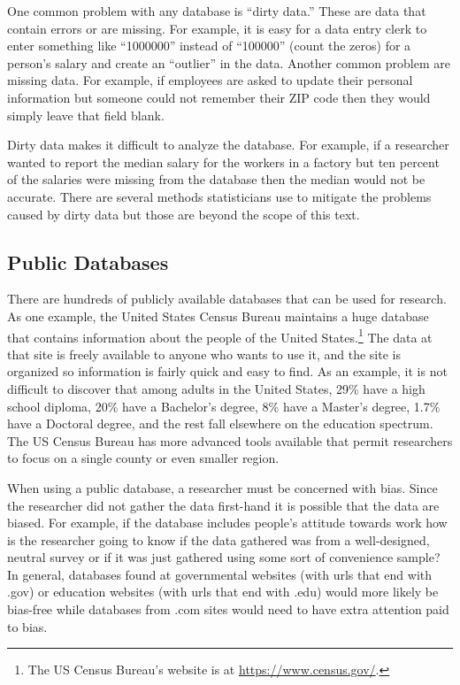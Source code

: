 One common problem with any database is ``dirty data.'' These are data that contain errors or are missing. For example, it is easy for a data entry clerk to enter something like ``1000000'' instead of ``100000'' (count the zeros) for a person's salary and create an ``outlier'' in the data. Another common problem are missing data. For example, if employees are asked to update their personal information but someone could not remember their ZIP code then they would simply leave that field blank.

Dirty data makes it difficult to analyze the database. For example, if a researcher wanted to report the median salary for the workers in a factory but ten percent of the salaries were missing from the database then the median would not be accurate. There are several methods statisticians use to mitigate the problems caused by dirty data but those are beyond the scope of this text. 

\subsection{Public Databases}

There are hundreds of publicly available databases that can be used for research. As one example, the United States Census Bureau maintains a huge database that contains information about the people of the United States.\footnote{The US Census Bureau's website is at \url{https://www.census.gov/}.} The data at that site is freely available to anyone who wants to use it, and the site is organized so information is fairly quick and easy to find. As an example, it is not difficult to discover that among adults in the United States, 29\% have a high school diploma, 20\% have a Bachelor's degree, 8\% have a Master's degree, 1.7\% have a Doctoral degree, and the rest fall elsewhere on the education spectrum. The US Census Bureau has more advanced tools available that permit researchers to focus on a single county or even smaller region.

When using a public database, a researcher must be concerned with bias. Since the researcher did not gather the data first-hand it is possible that the data are biased. For example, if the database includes people's attitude towards work how is the researcher going to know if the data gathered was from a well-designed, neutral survey or if it was just gathered using some sort of convenience sample? In general, databases found at governmental websites (with urls that end with .gov) or education websites (with urls that end with .edu) would more likely be bias-free while databases from .com sites would need to have extra attention paid to bias.

